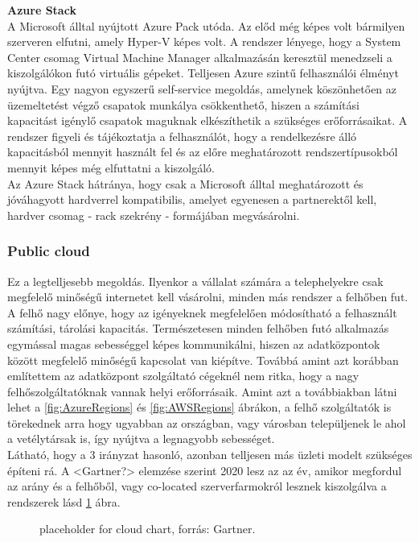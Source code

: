 \documentclass[12pt,oneside,justify,table]{book}
\begin{document}
\noindent \textbf{Azure Stack} \\
A Microsoft álltal nyújtott Azure Pack utóda. Az előd még képes volt bármilyen szerveren elfutni, amely Hyper-V képes volt. A rendszer lényege, hogy a System Center csomag Virtual Machine Manager  alkalmazásán keresztül menedzseli a kiszolgálókon futó virtuális gépeket. Telljesen Azure szintű felhasználói élményt nyújtva. Egy nagyon egyszerű self-service megoldás, amelynek köszönhetően az üzemeltetést végző csapatok munkálya csökkenthető, hiszen a számítási kapacitást igénylő csapatok maguknak elkészíthetik a szükséges erőforrásaikat. A rendszer figyeli és tájékoztatja a felhasználót, hogy a rendelkezésre álló kapacitásból mennyit használt fel és az előre meghatározott rendszertípusokból mennyit képes még elfuttatni a kiszolgáló. \\
Az Azure Stack hátránya, hogy csak a Microsoft álltal meghatározott és jóváhagyott hardverrel kompatibilis, amelyet egyenesen a partnerektől kell, hardver csomag - rack szekrény - formájában megvásárolni.  

\subsubsection{Public cloud}
Ez a legtelljesebb megoldás. Ilyenkor a vállalat számára a telephelyekre csak megfelelő minőségű internetet kell vásárolni, minden más rendszer a felhőben fut. A felhő nagy előnye, hogy az igényeknek megfelelően módosítható a felhasznált számítási, tárolási kapacitás. Természetesen minden felhőben futó alkalmazás egymással magas sebességgel képes kommunikálni, hiszen az adatközpontok között megfelelő minőségű kapcsolat van kiépítve. Továbbá amint azt korábban említettem az adatközpont szolgáltató cégeknél nem ritka, hogy a nagy felhőszolgáltatóknak vannak helyi erőforrásaik. Amint azt a továbbiakban látni lehet a \ref{fig:AzureRegions} és \ref{fig:AWSRegions} ábrákon, a felhő szolgáltatók is törekednek arra hogy ugyabban az országban, vagy városban települjenek le ahol a vetélytársak is, így nyújtva a legnagyobb sebességet. \\

Látható, hogy a 3 irányzat hasonló, azonban telljesen más üzleti modelt szükséges építeni rá. A <Gartner?> elemzése szerint 2020 lesz az az év, amikor megfordul az arány és a felhőből, vagy co-located szerverfarmokról lesznek kiszolgálva a rendszerek lásd \ref{fig:CloudVsOnPrem} ábra.   
\begin{figure}[H]
\centering
\caption{placeholder for cloud chart, forrás: Gartner.}
\label{fig:CloudVsOnPrem}
\end{figure}
\end{document}
